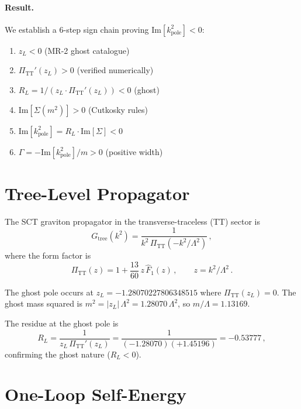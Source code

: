 \documentclass[11pt,a4paper]{article}
\newcommand{\PiTT}{\Pi_{\mathrm{TT}}}
\newcommand{\Fhat}{\hat{F}}
\newcommand{\Imag}{\mathrm{Im}}
\begin{document}
\paragraph{Result.}
We establish a 6-step sign chain proving $\Imag[k^2_{\mathrm{pole}}] < 0$:
\begin{enumerate}[nosep]
  \item $z_L < 0$ (MR-2 ghost catalogue)
  \item $\PiTT'(z_L) > 0$ (verified numerically)
  \item $R_L = 1/(z_L \cdot \PiTT'(z_L)) < 0$ (ghost)
  \item $\Imag[\Sigma(m^2)] > 0$ (Cutkosky rules)
  \item $\Imag[k^2_{\mathrm{pole}}] = R_L \cdot \Imag[\Sigma] < 0$
  \item $\Gamma = -\Imag[k^2_{\mathrm{pole}}]/m > 0$ (positive width)
\end{enumerate}


\section{Tree-Level Propagator}
\label{sec:tree}

The SCT graviton propagator in the transverse-traceless (TT) sector is
\begin{equation}\label{eq:G-tree}
  G_{\mathrm{tree}}(k^2)
  = \frac{1}{k^2\,\PiTT(-k^2/\Lambda^2)}\,,
\end{equation}
where the form factor is
\begin{equation}\label{eq:Pi-TT}
  \PiTT(z)
  = 1 + \frac{13}{60}\,z\,\Fhat_1(z)\,,
  \qquad
  z = k^2/\Lambda^2\,.
\end{equation}

The ghost pole occurs at $z_L = -1.28070227806348515$ where
$\PiTT(z_L) = 0$.  The ghost mass squared is
$m^2 = |z_L|\,\Lambda^2 = 1.28070\,\Lambda^2$, so
$m/\Lambda = 1.13169$.

The residue at the ghost pole is
\begin{equation}\label{eq:R-L}
  R_L
  = \frac{1}{z_L\,\PiTT'(z_L)}
  = \frac{1}{(-1.28070)(+1.45196)}
  = -0.53777\,,
\end{equation}
confirming the ghost nature ($R_L < 0$).


\section{One-Loop Self-Energy}
\label{sec:self-energy}
\end{document}
